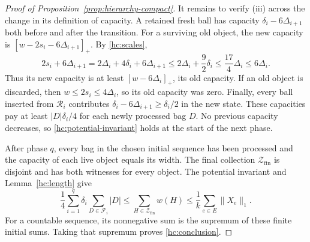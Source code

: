 \begin{proof}[Proof of Proposition~\ref{prop:hierarchy-compact}]
It remains to verify (iii) across the change in its definition of
capacity.  A retained fresh ball has capacity
\(\delta_i-6\Delta_{i+1}\) both before and after the transition.
For a surviving old object, the new capacity is
\([
w-2s_i-6\Delta_{i+1}]_+\).  By \eqref{hc:scales},
\begin{equation}
\label{hc:reserve}
 2s_i+6\Delta_{i+1}
 =2\Delta_i+4\delta_i+6\Delta_{i+1}
 \le2\Delta_i+\frac92\delta_i
 \le\frac{17}{4}\Delta_i
 \le6\Delta_i.
\end{equation}
Thus its new capacity is at least \([w-6\Delta_i]_+\), its old
capacity.  If an old object is discarded, then
\(w\le2s_i\le4\Delta_i\), so its old capacity was zero.
Finally, every ball inserted from \(\mathcal R_i\) contributes
\(\delta_i-6\Delta_{i+1}\ge\delta_i/2\) in the new state.  These
capacities pay at least \(|D|\delta_i/4\) for each newly processed
bag \(D\).  No previous capacity decreases, so
\eqref{hc:potential-invariant} holds at the start of the next phase.

After phase \(q\), every bag in the chosen initial sequence has been
processed and the capacity of each live object equals its width.
The final collection \(\mathcal Z_{\mathrm{fin}}\) is disjoint and
has both witnesses for every object.  The potential invariant and
Lemma~\ref{hc:length} give
\[
 \frac14\sum_{i=1}^q\delta_i\sum_{D\in\mathcal F_i}|D|
 \le\sum_{H\in\mathcal Z_{\mathrm{fin}}}w(H)
 \le\frac1k\sum_{e\in E}\|X_e\|_1.
\]
For a countable sequence, its nonnegative sum is the supremum of
these finite initial sums.  Taking that supremum proves
\eqref{hc:conclusion}.
\end{proof}
